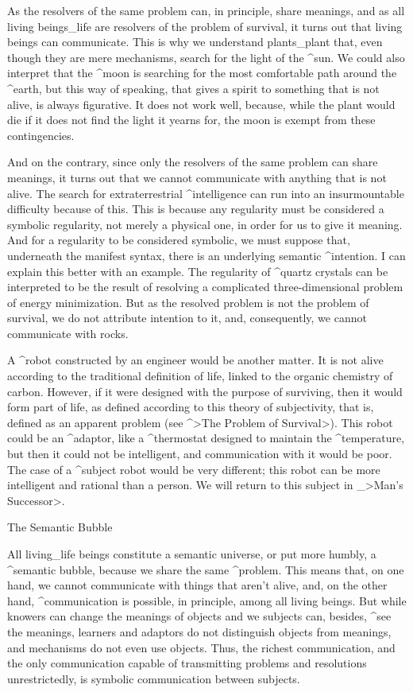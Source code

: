 As the resolvers of the same problem can, in principle, share meanings,
and as all living beings_{life} are resolvers of the problem of
survival, it turns out that living beings can communicate. This is why
we understand plants_{plant} that, even though they are mere mechanisms,
search for the light of the ^{sun}. We could also interpret that the
^{moon} is searching for the most comfortable path around the ^{earth},
but this way of speaking, that gives a spirit to something that is not
alive, is always figurative. It does not work well, because, while the
plant would die if it does not find the light it yearns for, the moon is
exempt from these contingencies.

And on the contrary, since only the resolvers of the same problem can
share meanings, it turns out that we cannot communicate with anything
that is not alive. The search for extraterrestrial ^{intelligence} can
run into an insurmountable difficulty because of this. This is because
any regularity must be considered a symbolic regularity, not merely a
physical one, in order for us to give it meaning. And for a regularity
to be considered symbolic, we must suppose that, underneath the manifest
syntax, there is an underlying semantic ^{intention}. I can explain this
better with an example. The regularity of ^{quartz} crystals can be
interpreted to be the result of resolving a complicated
three-dimensional problem of energy minimization. But as the resolved
problem is not the problem of survival, we do not attribute intention to
it, and, consequently, we cannot communicate with rocks.

A ^{robot} constructed by an engineer would be another matter. It is not
alive according to the traditional definition of life, linked to the
organic chemistry of carbon. However, if it were designed with the
purpose of surviving, then it would form part of life, as defined
according to this theory of subjectivity, that is, defined as an
apparent problem (see ^>The Problem of Survival>). This robot could be
an ^{adaptor}, like a ^{thermostat} designed to maintain the
^{temperature}, but then it could not be intelligent, and communication
with it would be poor. The case of a ^{subject} robot would be very
different; this robot can be more intelligent and rational than a
person. We will return to this subject in _>Man's Successor>.


\Section The Semantic Bubble

All living_{life} beings constitute a semantic universe, or put more
humbly, a ^{semantic bubble}, because we share the same ^{problem}. This
means that, on one hand, we cannot communicate with things that aren't
alive, and, on the other hand, ^{communication} is possible, in
principle, among all living beings. But while knowers can change the
meanings of objects and we subjects can, besides, ^{see} the meanings,
learners and adaptors do not distinguish objects from meanings, and
mechanisms do not even use objects. Thus, the richest communication, and
the only communication capable of transmitting problems and resolutions
unrestrictedly, is symbolic communication between subjects.


